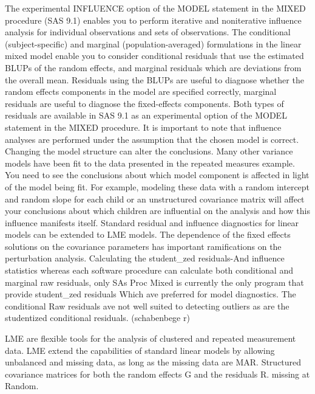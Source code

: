 \documentclass[]{article}
\begin{document}
The experimental INFLUENCE
option of the MODEL statement in the MIXED procedure (SAS 9.1) enables you to perform iterative and
noniterative influence analysis for individual observations and sets of observations.
The conditional (subject-specific) and marginal (population-averaged) formulations in the linear mixed model
enable you to consider conditional residuals that use the estimated BLUPs of the random effects, and
marginal residuals which are deviations from the overall mean. Residuals using the BLUPs are useful to
diagnose whether the random effects components in the model are specified correctly, marginal residuals
are useful to diagnose the fixed-effects components. Both types of residuals are available in SAS 9.1 as an
experimental option of the MODEL statement in the MIXED procedure.
It is important to note that influence analyses are performed under the assumption that the chosen model
is correct. Changing the model structure can alter the conclusions. Many other variance models have been
fit to the data presented in the repeated measures example. You need to see the conclusions about which
model component is affected in light of the model being fit. For example, modeling these data with a random
intercept and random slope for each child or an unstructured covariance matrix will affect your conclusions
about which children are influential on the analysis and how this influence manifests itself.
Standard residual and influence diagnostics for linear models can be extended to LME models.
The dependence of the fixed effects solutions on the covariance parameters has important ramifications on the perturbation analysis.	
Calculating the student_zed residuals-And influence statistics whereas each software procedure can calculate both conditional and marginal raw residuals, only SAs Proc Mixed is currently the only program that provide student_zed residuals Which ave preferred for model diagnostics. The conditional Raw residuals ave not well suited to detecting outliers as are the studentized conditional residuals. (schabenbege r)
 
 
LME are flexible tools for the analysis of clustered and repeated measurement data. LME extend the capabilities of standard linear models by allowing unbalanced and missing data, as long as the missing data are MAR. Structured covariance matrices for both the random effects G and the residuals R. missing at Random.
 
\end{document}
